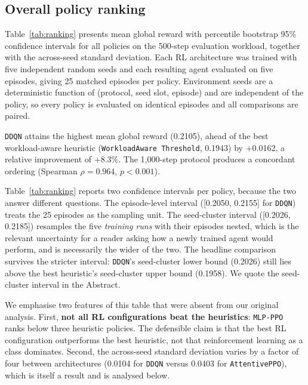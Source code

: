 \documentclass[fleqn,10pt]{wlscirep}
\newcommand{\attentive}{\texttt{AttentivePPO}}
\newcommand{\mlpppo}{\texttt{MLP-PPO}}
\newcommand{\ddqn}{\texttt{DDQN}}
\begin{document}
\FloatBarrier

\subsection*{Overall policy ranking}
\label{sec:ranking}

Table~\ref{tab:ranking} presents mean global reward with percentile
bootstrap 95\% confidence intervals for all policies on the 500-step
evaluation workload, together with the across-seed standard deviation.
Each RL architecture was trained with five independent random seeds and
each resulting agent evaluated on five episodes, giving 25 matched
episodes per policy. Environment seeds are a deterministic function of
(protocol, seed slot, episode) and are independent of the policy, so
every policy is evaluated on identical episodes and all comparisons are
paired.

\ddqn{} attains the highest mean global reward (0.2105), ahead of the
best workload-aware heuristic (\texttt{WorkloadAware\allowbreak
Threshold}, 0.1943)
by $+$0.0162, a relative improvement of $+$8.3\%. The 1{,}000-step
protocol produces a concordant ordering (Spearman $\rho = 0.964$,
$p < 0.001$).

Table~\ref{tab:ranking} reports two confidence intervals per policy,
because the two answer different questions. The episode-level interval
([0.2050, 0.2155] for \ddqn{}) treats the 25 episodes as the sampling
unit. The seed-cluster interval ([0.2026, 0.2185]) resamples the five
\emph{training runs} with their episodes nested, which is the relevant
uncertainty for a reader asking how a newly trained agent would perform,
and is necessarily the wider of the two. The headline comparison
survives the stricter interval: \ddqn{}'s seed-cluster lower bound
(0.2026) still lies above the best heuristic's seed-cluster upper bound
(0.1958). We quote the seed-cluster interval in the Abstract.

We emphasise two features of this table that were absent from our
original analysis. First, \textbf{not all RL configurations beat the
heuristics}: \mlpppo{} ranks below three heuristic policies. The
defensible claim is that the best RL configuration outperforms the best
heuristic, not that reinforcement learning as a class dominates.
Second, the across-seed standard deviation varies by a factor of four
between architectures (0.0104 for \ddqn{} versus 0.0403 for
\attentive{}), which is itself a result and is analysed below.
\end{document}
